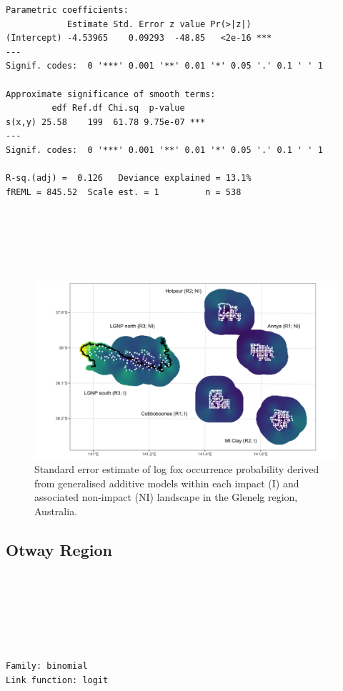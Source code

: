 \documentclass[11pt,a4paper,titlepage,twoside,openright]{style/unimelbthesis}
\begin{document}
\begin{mainmatter}
\begin{verbatim}
Parametric coefficients:
            Estimate Std. Error z value Pr(>|z|)    
(Intercept) -4.53965    0.09293  -48.85   <2e-16 ***
---
Signif. codes:  0 '***' 0.001 '**' 0.01 '*' 0.05 '.' 0.1 ' ' 1

Approximate significance of smooth terms:
         edf Ref.df Chi.sq  p-value    
s(x,y) 25.58    199  61.78 9.75e-07 ***
---
Signif. codes:  0 '***' 0.001 '**' 0.01 '*' 0.05 '.' 0.1 ' ' 1

R-sq.(adj) =  0.126   Deviance explained = 13.1%
fREML = 845.52  Scale est. = 1         n = 538
\end{verbatim}
\newpage

\(~\)

\(~\)

\(~\)
\begin{figure}

{\centering \includegraphics[width=1\linewidth]{figure/fox_occ_se_glenelg_600dpi} 

}

\caption{Standard error estimate of log fox occurrence probability derived from generalised additive models within each impact (I) and associated non-impact (NI) landscape in the Glenelg region, Australia.}\label{fig:density-fox-se-g}
\end{figure}
\newpage

\hypertarget{otway-region-1}{%
\subsection{Otway Region}\label{otway-region-1}}

\(~\)

\(~\)

\(~\)
\begin{verbatim}

Family: binomial 
Link function: logit 


\end{verbatim}
\end{mainmatter}
\end{document}
